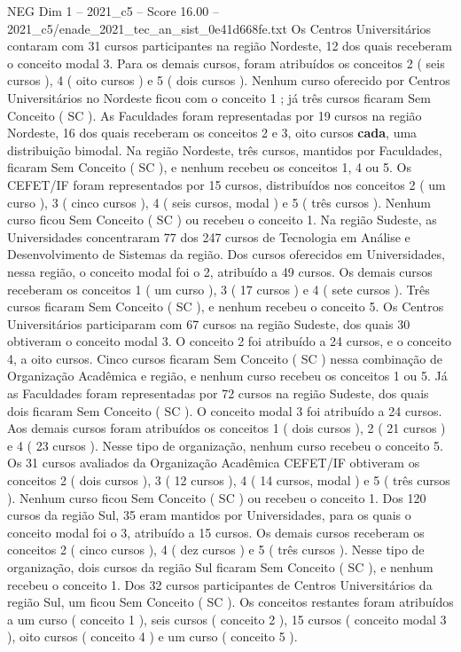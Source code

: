 \begin{textsample}{NEG Dim 1 – 2021\_c5 – Score 16.00 – 2021\_c5/enade\_2021\_tec\_an\_sist\_0e41d668fe.txt}
Os Centros Universitários contaram com 31 cursos participantes na região Nordeste, 12 dos quais receberam o conceito modal 3.
Para os demais cursos, foram atribuídos os conceitos 2 ( seis cursos ), 4 ( oito cursos ) e 5 ( dois cursos ).
Nenhum curso oferecido por Centros Universitários no Nordeste ficou com o conceito 1 ; já três cursos ficaram Sem Conceito ( SC ).
As Faculdades foram representadas por 19 cursos na região Nordeste, 16 dos quais receberam os conceitos 2 e 3, oito cursos \textbf{cada}, uma distribuição bimodal.
Na região Nordeste, três cursos, mantidos por Faculdades, ficaram Sem Conceito ( SC ), e nenhum recebeu os conceitos 1, 4 ou 5.
Os CEFET/IF foram representados por 15 cursos, distribuídos nos conceitos 2 ( um curso ), 3 ( cinco cursos ), 4 ( seis cursos, modal ) e 5 ( três cursos ).
Nenhum curso ficou Sem Conceito ( SC ) ou recebeu o conceito 1.
Na região Sudeste, as Universidades concentraram 77 dos 247 cursos de Tecnologia em Análise e Desenvolvimento de Sistemas da região.
Dos cursos oferecidos em Universidades, nessa região, o conceito modal foi o 2, atribuído a 49 cursos.
Os demais cursos receberam os conceitos 1 ( um curso ), 3 ( 17 cursos ) e 4 ( sete cursos ).
Três cursos ficaram Sem Conceito ( SC ), e nenhum recebeu o conceito 5.
Os Centros Universitários participaram com 67 cursos na região Sudeste, dos quais 30 obtiveram o conceito modal 3.
O conceito 2 foi atribuído a 24 cursos, e o conceito 4, a oito cursos.
Cinco cursos ficaram Sem Conceito ( SC ) nessa combinação de Organização Acadêmica e região, e nenhum curso recebeu os conceitos 1 ou 5.
Já as Faculdades foram representadas por 72 cursos na região Sudeste, dos quais dois ficaram Sem Conceito ( SC ).
O conceito modal 3 foi atribuído a 24 cursos.
Aos demais cursos foram atribuídos os conceitos 1 ( dois cursos ), 2 ( 21 cursos ) e 4 ( 23 cursos ).
Nesse tipo de organização, nenhum curso recebeu o conceito 5.
Os 31 cursos avaliados da Organização Acadêmica CEFET/IF obtiveram os conceitos 2 ( dois cursos ), 3 ( 12 cursos ), 4 ( 14 cursos, modal ) e 5 ( três cursos ).
Nenhum curso ficou Sem Conceito ( SC ) ou recebeu o conceito 1.
Dos 120 cursos da região Sul, 35 eram mantidos por Universidades, para os quais o conceito modal foi o 3, atribuído a 15 cursos.
Os demais cursos receberam os conceitos 2 ( cinco cursos ), 4 ( dez cursos ) e 5 ( três cursos ).
Nesse tipo de organização, dois cursos da região Sul ficaram Sem Conceito ( SC ), e nenhum recebeu o conceito 1.
Dos 32 cursos participantes de Centros Universitários da região Sul, um ficou Sem Conceito ( SC ).
Os conceitos restantes foram atribuídos a um curso ( conceito 1 ), seis cursos ( conceito 2 ), 15 cursos ( conceito modal 3 ), oito cursos ( conceito 4 ) e um curso ( conceito 5 ).

\end{textsample}

